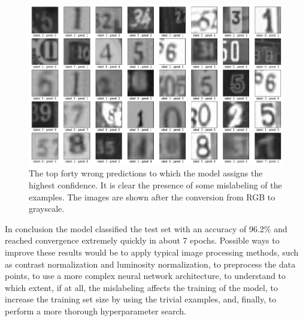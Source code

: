 \documentclass[12pt]{article}
\begin{document}
\begin{figure}[h]
	\centering
	\includegraphics[width=\textwidth]{worst_pred}
	\caption{The top forty wrong predictions to which the model assigns the highest confidence. It is clear the presence of some mislabeling of the examples. The images are shown after the conversion from RGB to grayscale.}
	\label{fig:worst_PRED}
\end{figure}

In conclusion the model classified the test set with an accuracy of 96.2\% and reached convergence extremely quickly in about 7 epochs. Possible ways to improve these results would be to apply typical image processing methods, such as contrast normalization and luminosity normalization, to preprocess the data points, to use a more complex neural network architecture, to understand to which extent, if at all, the mislabeling affects the training of the model, to increase the training set size by using the trivial examples, and, finally, to perform a more thorough hyperparameter search.
\end{document}
